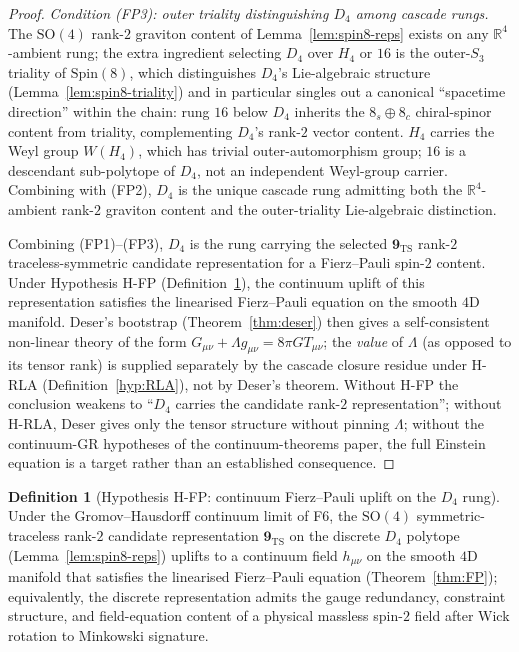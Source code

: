 \documentclass[12pt]{article}
\theoremstyle{definition}
\newtheorem{definition}[theorem]{Definition}
\theoremstyle{remark}
\begin{document}
\begin{proof}
\emph{Condition (FP3): outer triality distinguishing $D_4$ among cascade rungs.} The $\mathrm{SO}(4)$ rank-$2$ graviton content of Lemma~\ref{lem:spin8-reps} exists on any $\mathbb{R}^4$-ambient rung; the extra ingredient selecting $D_4$ over $H_4$ or $16$ is the outer-$S_3$ triality of $\mathrm{Spin}(8)$, which distinguishes $D_4$'s Lie-algebraic structure (Lemma~\ref{lem:spin8-triality}) and in particular singles out a canonical ``spacetime direction'' within the chain: rung $16$ below $D_4$ inherits the $8_s \oplus 8_c$ chiral-spinor content from triality, complementing $D_4$'s rank-$2$ vector content. $H_4$ carries the Weyl group $W(H_4)$, which has trivial outer-automorphism group; $16$ is a descendant sub-polytope of $D_4$, not an independent Weyl-group carrier. Combining with (FP2), $D_4$ is the unique cascade rung admitting both the $\mathbb{R}^4$-ambient rank-$2$ graviton content and the outer-triality Lie-algebraic distinction.

Combining (FP1)--(FP3), $D_4$ is the rung carrying the selected $\mathbf{9}_{\mathrm{TS}}$ rank-$2$ traceless-symmetric candidate representation for a Fierz--Pauli spin-$2$ content. Under Hypothesis H-FP (Definition~\ref{hyp:FP}), the continuum uplift of this representation satisfies the linearised Fierz--Pauli equation on the smooth $4$D manifold. Deser's bootstrap (Theorem~\ref{thm:deser}) then gives a self-consistent non-linear theory of the form $G_{\mu\nu} + \Lambda g_{\mu\nu} = 8\pi G T_{\mu\nu}$; the \emph{value} of $\Lambda$ (as opposed to its tensor rank) is supplied separately by the cascade closure residue under H-RLA (Definition~\ref{hyp:RLA}), not by Deser's theorem. Without H-FP the conclusion weakens to ``$D_4$ carries the candidate rank-$2$ representation''; without H-RLA, Deser gives only the tensor structure without pinning $\Lambda$; without the continuum-GR hypotheses of the continuum-theorems paper, the full Einstein equation is a target rather than an established consequence.
\end{proof}

\begin{definition}[Hypothesis H-FP: continuum Fierz--Pauli uplift on the $D_4$ rung]\label{hyp:FP}
Under the Gromov--Hausdorff continuum limit of F6, the $\mathrm{SO}(4)$ symmetric-traceless rank-$2$ candidate representation $\mathbf{9}_{\mathrm{TS}}$ on the discrete $D_4$ polytope (Lemma~\ref{lem:spin8-reps}) uplifts to a continuum field $h_{\mu\nu}$ on the smooth $4$D manifold that satisfies the linearised Fierz--Pauli equation (Theorem~\ref{thm:FP}); equivalently, the discrete representation admits the gauge redundancy, constraint structure, and field-equation content of a physical massless spin-$2$ field after Wick rotation to Minkowski signature.
\end{definition}
\end{document}
